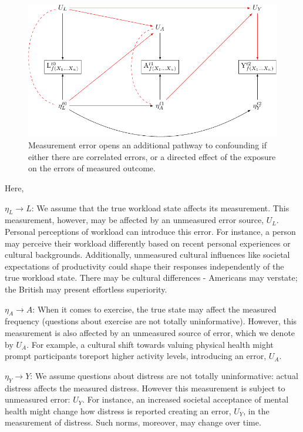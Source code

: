 \documentclass[
  singlecolumn]{report}
\begin{document}
\begin{figure}

{\centering \includegraphics[width=1\textwidth,height=\textheight]{causal-dags_files/figure-pdf/fig-dag-dep-udir-effect-confounders-3wave-1.pdf}

}

\caption{\label{fig-dag-dep-udir-effect-confounders-3wave}Measurement
error opens an additional pathway to confounding if either there are
correlated errors, or a directed effect of the exposure on the errors of
measured outcome.}

\end{figure}

Here,

\(\eta_L \rightarrow L\): We assume that the true workload state affects
its measurement. This measurement, however, may be affected by an
unmeasured error source, \(U_{L}\). Personal perceptions of workload can
introduce this error. For instance, a person may perceive their workload
differently based on recent personal experiences or cultural
backgrounds. Additionally, unmeasured cultural influences like societal
expectations of productivity could shape their responses independently
of the true workload state. There may be cultural differences -
Americans may verstate; the British may present effortless superiority.

\(\eta_A \rightarrow A\): When it comes to exercise, the true state may
affect the measured frequency (questions about exercise are not totally
uninformative). However, this measurement is also affected by an
unmeasured source of error, which we denote by \(U_{A}\). For example, a
cultural shift towards valuing physical health might prompt participants
toreport higher activity levels, introducing an error, \(U_{A}\).

\(\eta_Y \rightarrow Y\): We assume questions about distress are not
totally uninformative: actual distress affects the measured distress.
However this measurement is subject to unmeasured error: \(U_{Y}\). For
instance, an increased societal acceptance of mental health might change
how distress is reported creating an error, \(U_{Y}\), in the
measurement of distress. Such norms, moreover, may change over time.
\end{document}
